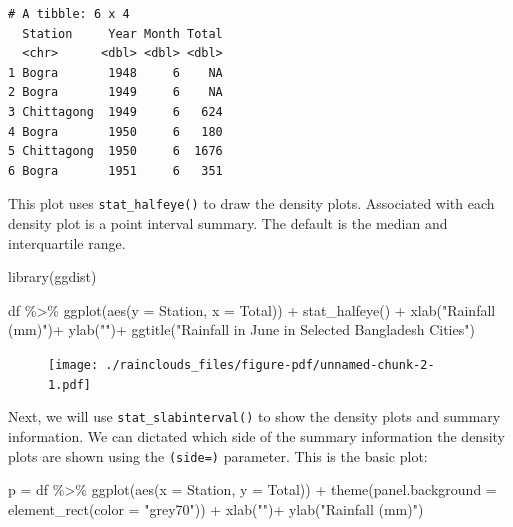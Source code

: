 \documentclass[
  letterpaper,
  DIV=11,
  numbers=noendperiod]{scrreprt}
\newenvironment{Shaded}{\begin{snugshade}}{\end{snugshade}}
\newcommand{\AttributeTok}[1]{\textcolor[rgb]{0.40,0.45,0.13}{#1}}
\newcommand{\FunctionTok}[1]{\textcolor[rgb]{0.28,0.35,0.67}{#1}}
\newcommand{\NormalTok}[1]{\textcolor[rgb]{0.00,0.23,0.31}{#1}}
\newcommand{\OtherTok}[1]{\textcolor[rgb]{0.00,0.23,0.31}{#1}}
\newcommand{\SpecialCharTok}[1]{\textcolor[rgb]{0.37,0.37,0.37}{#1}}
\newcommand{\StringTok}[1]{\textcolor[rgb]{0.13,0.47,0.30}{#1}}
\begin{document}
\begin{verbatim}
# A tibble: 6 x 4
  Station     Year Month Total
  <chr>      <dbl> <dbl> <dbl>
1 Bogra       1948     6    NA
2 Bogra       1949     6    NA
3 Chittagong  1949     6   624
4 Bogra       1950     6   180
5 Chittagong  1950     6  1676
6 Bogra       1951     6   351
\end{verbatim}

This plot uses \texttt{stat\_halfeye()} to draw the density plots.
Associated with each density plot is a point interval summary. The
default is the median and interquartile range.

\begin{Shaded}
\begin{Highlighting}[]
\FunctionTok{library}\NormalTok{(ggdist)}

\NormalTok{df }\SpecialCharTok{\%\textgreater{}\%}
  \FunctionTok{ggplot}\NormalTok{(}\FunctionTok{aes}\NormalTok{(}\AttributeTok{y =}\NormalTok{ Station, }\AttributeTok{x =}\NormalTok{ Total)) }\SpecialCharTok{+}
  \FunctionTok{stat\_halfeye}\NormalTok{() }\SpecialCharTok{+}
  \FunctionTok{xlab}\NormalTok{(}\StringTok{"Rainfall (mm)"}\NormalTok{)}\SpecialCharTok{+}
  \FunctionTok{ylab}\NormalTok{(}\StringTok{""}\NormalTok{)}\SpecialCharTok{+}
  \FunctionTok{ggtitle}\NormalTok{(}\StringTok{"Rainfall in June in Selected Bangladesh Cities"}\NormalTok{)}
\end{Highlighting}
\end{Shaded}

\begin{figure}[H]

{\centering \texttt{[image: ./rainclouds\_files/figure-pdf/unnamed-chunk-2-1.pdf]}

}

\end{figure}

Next, we will use \texttt{stat\_slabinterval()} to show the density
plots and summary information. We can dictated which side of the summary
information the density plots are shown using the \texttt{(side=)}
parameter. This is the basic plot:

\begin{Shaded}
\begin{Highlighting}[]
\NormalTok{p }\OtherTok{=}\NormalTok{ df }\SpecialCharTok{\%\textgreater{}\%}
  \FunctionTok{ggplot}\NormalTok{(}\FunctionTok{aes}\NormalTok{(}\AttributeTok{x =}\NormalTok{ Station, }\AttributeTok{y =}\NormalTok{ Total)) }\SpecialCharTok{+}
  \FunctionTok{theme}\NormalTok{(}\AttributeTok{panel.background =} \FunctionTok{element\_rect}\NormalTok{(}\AttributeTok{color =} \StringTok{"grey70"}\NormalTok{)) }\SpecialCharTok{+}
  \FunctionTok{xlab}\NormalTok{(}\StringTok{""}\NormalTok{)}\SpecialCharTok{+}
  \FunctionTok{ylab}\NormalTok{(}\StringTok{"Rainfall (mm)"}\NormalTok{)}
\end{Highlighting}
\end{Shaded}
\end{document}
